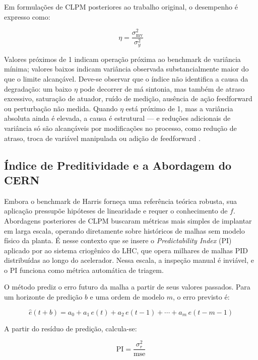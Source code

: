 Em formulações de CLPM posteriores ao trabalho original, o desempenho é expresso como:

\begin{equation}
	\eta = \frac{\sigma^2_{\text{mv}}}{\sigma^2_y}
	\label{eq:harris_index}
\end{equation}

\noindent Valores próximos de 1 indicam operação próxima ao benchmark de variância mínima; valores baixos indicam variância observada substancialmente maior do que o limite alcançável. Deve-se observar que o índice não identifica a causa da degradação: um baixo $\eta$ pode decorrer de má sintonia, mas também de atraso excessivo, saturação de atuador, ruído de medição, ausência de ação feedforward ou perturbação não medida. Quando $\eta$ está próximo de 1, mas a variância absoluta ainda é elevada, a causa é estrutural --- e reduções adicionais de variância só são alcançáveis por modificações no processo, como redução de atraso, troca de variável manipulada ou adição de feedforward \cite{Harris1989}.

\subsection{Índice de Preditividade e a Abordagem do CERN}

Embora o benchmark de Harris forneça uma referência teórica robusta, sua aplicação pressupõe hipóteses de linearidade e requer o conhecimento de $f$. Abordagens posteriores de CLPM buscaram métricas mais simples de implantar em larga escala, operando diretamente sobre históricos de malhas sem modelo físico da planta. É nesse contexto que se insere o \textit{Predictability Index} (PI) aplicado por  ao sistema criogênico do LHC, que opera milhares de malhas PID distribuídas ao longo do acelerador. Nessa escala, a inspeção manual é inviável, e o PI funciona como métrica automática de triagem.

O método prediz o erro futuro da malha a partir de seus valores passados. Para um horizonte de predição $b$ e uma ordem de modelo $m$, o erro previsto é:

\begin{equation}
	\hat{e}(t+b) = a_0 + a_1\,e(t) + a_2\,e(t-1) + \cdots + a_m\,e(t-m-1)
	\label{eq:pi_pred}
\end{equation}

A partir do resíduo de predição, calcula-se:

\begin{equation}
	\text{PI} = \frac{\sigma^2_r}{\text{mse}}
	\label{eq:pi_index}
\end{equation}

